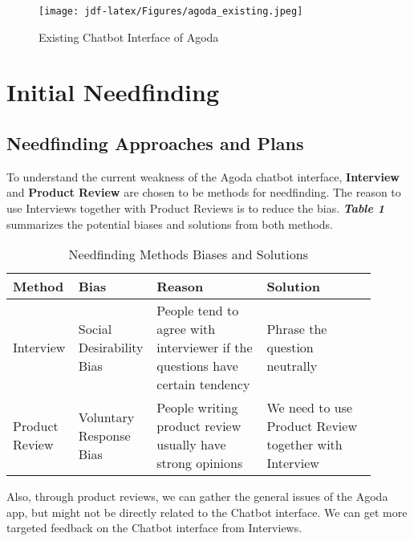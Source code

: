 \documentclass[
	letterpaper, %
]{jdf}
\begin{document}
\begin{figure}[hbt!]
	\centering
	\texttt{[image: jdf-latex/Figures/agoda\_existing.jpeg]}
	\caption{Existing Chatbot Interface of Agoda}
	\label{fig:wizard}
\end{figure}

\section{Initial Needfinding}
\subsection{Needfinding Approaches and Plans}

To understand the current weakness of the Agoda chatbot interface, \textbf{Interview} and \textbf{Product Review} are chosen to be methods for needfinding. The reason to use Interviews together with Product Reviews is to reduce the bias. \textit{\textbf{Table 1}} summarizes the potential biases and solutions from both methods.

\begin{table}[hbt!]
	\caption{Needfinding Methods Biases and Solutions}
	\small %
	\centering %
	\begin{tabular}{L{0.1\linewidth} L{0.2\linewidth} L{0.3\linewidth} L{0.3\linewidth}}
		\textbf{Method} & \textbf{Bias} & \textbf{Reason} & \textbf{Solution} \\
		\toprule[0.5pt]
		Interview & Social Desirability Bias & People tend to agree with interviewer if the questions have certain tendency & Phrase the question neutrally \\
		\midrule
		Product Review & Voluntary Response Bias & People writing product review usually have strong opinions & We need to use Product Review together with Interview \\
	\end{tabular}
\end{table}

Also, through product reviews, we can gather the general issues of the Agoda app, but might not be directly related to the Chatbot interface. We can get more targeted feedback on the Chatbot interface from Interviews.
\end{document}
